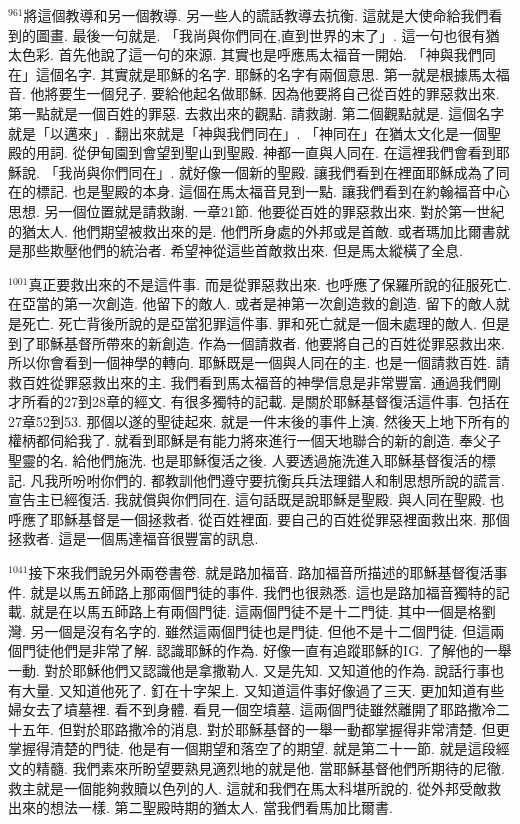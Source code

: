 \documentclass{book}
\begin{document}
$^{961}$將這個教導和另一個教導.
另一些人的謊話教導去抗衡.
這就是大使命給我們看到的圖畫.
最後一句就是.
「我尚與你們同在,直到世界的末了」.
這一句也很有猶太色彩.
首先他說了這一句的來源.
其實也是呼應馬太福音一開始.
「神與我們同在」這個名字.
其實就是耶穌的名字.
耶穌的名字有兩個意思.
第一就是根據馬太福音.
他將要生一個兒子.
要給他起名做耶穌.
因為他要將自己從百姓的罪惡救出來.
第一點就是一個百姓的罪惡.
去救出來的觀點.
請救謝.
第二個觀點就是.
這個名字就是「以邁來」.
翻出來就是「神與我們同在」.
「神同在」在猶太文化是一個聖殿的用詞.
從伊甸園到會望到聖山到聖殿.
神都一直與人同在.
在這裡我們會看到耶穌說.
「我尚與你們同在」.
就好像一個新的聖殿.
讓我們看到在裡面耶穌成為了同在的標記.
也是聖殿的本身.
這個在馬太福音見到一點.
讓我們看到在約翰福音中心思想.
另一個位置就是請救謝.
一章21節.
他要從百姓的罪惡救出來.
對於第一世紀的猶太人.
他們期望被救出來的是.
他們所身處的外邦或是首敵.
或者瑪加比爾書就是那些欺壓他們的統治者.
希望神從這些首敵救出來.
但是馬太縱橫了全息.

$^{1001}$真正要救出來的不是這件事.
而是從罪惡救出來.
也呼應了保羅所說的征服死亡.
在亞當的第一次創造.
他留下的敵人.
或者是神第一次創造救的創造.
留下的敵人就是死亡.
死亡背後所說的是亞當犯罪這件事.
罪和死亡就是一個未處理的敵人.
但是到了耶穌基督所帶來的新創造.
作為一個請救者.
他要將自己的百姓從罪惡救出來.
所以你會看到一個神學的轉向.
耶穌既是一個與人同在的主.
也是一個請救百姓.
請救百姓從罪惡救出來的主.
我們看到馬太福音的神學信息是非常豐富.
通過我們剛才所看的27到28章的經文.
有很多獨特的記載.
是關於耶穌基督復活這件事.
包括在27章52到53.
那個以遂的聖徒起來.
就是一件末後的事件上演.
然後天上地下所有的權柄都伺給我了.
就看到耶穌是有能力將來進行一個天地聯合的新的創造.
奉父子聖靈的名.
給他們施洗.
也是耶穌復活之後.
人要透過施洗進入耶穌基督復活的標記.
凡我所吩咐你們的.
都教訓他們遵守要抗衡兵兵法理錯人和制思想所說的謊言.
宣告主已經復活.
我就償與你們同在.
這句話既是說耶穌是聖殿.
與人同在聖殿.
也呼應了耶穌基督是一個拯救者.
從百姓裡面.
要自己的百姓從罪惡裡面救出來.
那個拯救者.
這是一個馬達福音很豐富的訊息.

$^{1041}$接下來我們說另外兩卷書卷.
就是路加福音.
路加福音所描述的耶穌基督復活事件.
就是以馬五師路上那兩個門徒的事件.
我們也很熟悉.
這也是路加福音獨特的記載.
就是在以馬五師路上有兩個門徒.
這兩個門徒不是十二門徒.
其中一個是格劉灣.
另一個是沒有名字的.
雖然這兩個門徒也是門徒.
但他不是十二個門徒.
但這兩個門徒他們是非常了解.
認識耶穌的作為.
好像一直有追蹤耶穌的IG.
了解他的一舉一動.
對於耶穌他們又認識他是拿撒勒人.
又是先知.
又知道他的作為.
說話行事也有大量.
又知道他死了.
釘在十字架上.
又知道這件事好像過了三天.
更加知道有些婦女去了墳墓裡.
看不到身體.
看見一個空墳墓.
這兩個門徒雖然離開了耶路撒冷二十五年.
但對於耶路撒冷的消息.
對於耶穌基督的一舉一動都掌握得非常清楚.
但更掌握得清楚的門徒.
他是有一個期望和落空了的期望.
就是第二十一節.
就是這段經文的精髓.
我們素來所盼望要熟見適烈地的就是他.
當耶穌基督他們所期待的尼徹.
救主就是一個能夠救贖以色列的人.
這就和我們在馬太科堪所說的.
從外邦受敵救出來的想法一樣.
第二聖殿時期的猶太人.
當我們看馬加比爾書.
\end{document}
